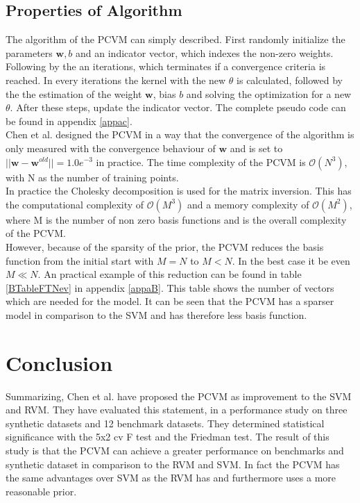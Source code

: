 \subsection{Properties of Algorithm}\label{PcSubSecAlgo}
The algorithm of the \acs{PCVM} can simply described.
First randomly initialize the parameters $\mathbf{w},b$ and an indicator vector, which indexes the non-zero weights.
Following by the an iterations, which terminates if a convergence criteria is reached. 
In every iterations the kernel with the new $\theta$ is calculated, followed by the the estimation of the weight $\mathbf{w}$, bias $b$ and solving the optimization for a new $\theta$. After these steps, update the indicator vector.\cite{Chen.2009}
The complete pseudo code can be found in appendix \ref{appac}.\\
Chen et al. designed the \acs{PCVM} in a way that the convergence of the algorithm is only measured with the convergence behaviour of $\mathbf{w}$ and is set to $||{\mathbf{w}-\mathbf{w}^{old}}|| = 1.0e^{-3}$ in practice. 
The time complexity of the \acs{PCVM} is $\mathcal{O}(N^3)$, with N as the number of training points.\\
In practice the Cholesky decomposition is used for the matrix inversion. 
This has the computational complexity of $\mathcal{O}(M^3)$ and a memory complexity of $\mathcal{O}(M^2)$, where M is the number of non zero basis functions and is the overall complexity of the \acs{PCVM}.\cite{Chen.2009}\\
However, because of the sparsity of the prior, the \acs{PCVM} reduces the basis function from the initial start with $M = N$ to $M < N$.
In the best case it be even $M \ll N$.
An practical example of this reduction can be found in table \ref{BTableFTNev} in appendix \ref{appaB}. 
This table shows the number of vectors which are needed for the model. 
It can be seen that the \acs{PCVM} has a sparser model in comparison to the \acs{SVM} and has therefore less basis function.

\section{Conclusion}
Summarizing, Chen et al. have proposed the \acs{PCVM} as improvement to the \acs{SVM} and \acs{RVM}.
They have evaluated this statement, in a performance study on three synthetic datasets and 12 benchmark datasets.
They determined statistical significance with the 5x2 cv F test and the Friedman test.
The result of this study is that the \acs{PCVM} can achieve a greater performance on benchmarks and synthetic dataset in comparison to the \acs{RVM} and \acs{SVM}.
In fact the \acs{PCVM} has the same advantages over \ac{SVM} as the \acs{RVM} has and furthermore uses a more reasonable prior.\cite{Chen.2009}
